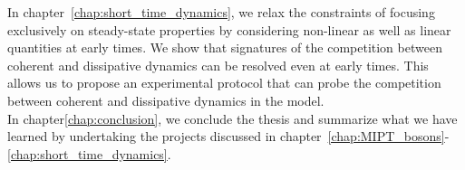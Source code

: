 In chapter~\ref{chap:short_time_dynamics}, we relax the constraints of focusing exclusively on steady-state properties by considering non-linear as well as linear quantities at early times. We show that signatures of the competition between coherent and dissipative dynamics can be resolved even at early times. This allows us to propose an experimental protocol that can probe the competition between coherent and dissipative dynamics in the model. \\

In chapter\ref{chap:conclusion}, we conclude the thesis and summarize what we have learned by undertaking the projects discussed in chapter~\ref{chap:MIPT_bosons}-\ref{chap:short_time_dynamics}. 
